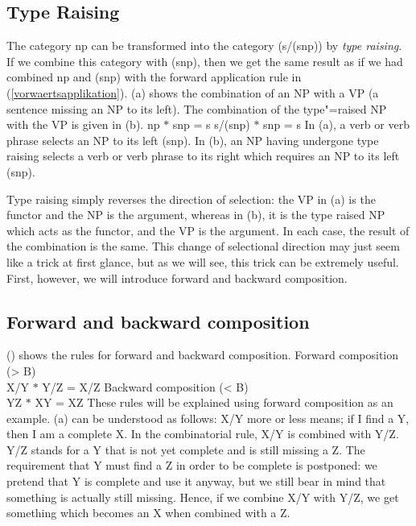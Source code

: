 \subsection{Type Raising}

\addlines
The category np can be transformed into the category (s/(s\bs np)) by \emph{type raising}. If we combine this category with (s\bs np), then we
get the same result as if we had combined np and (s\bs np) with the forward application rule in (\ref{vorwaertsapplikation}). (a) shows the combination of an NP
with a VP (a sentence missing an NP to its left). The combination of the type"=raised NP with the VP is given in (b).
\eal
\ex np $*$ s\bs np = s 
\ex s/(s\bs np) $*$ s\bs np = s
\zl
In (a), a verb or verb phrase selects an NP to its left (s\bs np). In (b), an NP having undergone type raising selects a verb or verb phrase to its right which requires
an NP to its left (s\bs np). 

Type raising simply reverses the direction of selection: the VP in (a) is the functor and the
NP is the argument, whereas in  (b), it is the type raised NP which acts as the functor,
and the VP is the argument. In each case, the result of the combination is the same. This change of selectional direction may just seem like a trick at first glance, but as we will see, this
trick can be extremely useful. First, however, we will introduce forward and backward composition.

\subsection{Forward and backward composition}
\label{Kategorialgrammatik-Komposition}

() shows the rules for forward and backward composition.
\eal
\ex\label{Regel-Vorwaertskomposition}
 Forward composition (> B)\\
    X/Y $*$ Y/Z = X/Z 
\ex Backward composition (< B)\\
    Y\bs Z $*$ X\bs Y = X\bs Z
\zl 
These rules will be explained using forward composition as an example. (a) can be understood as follows: X/Y more or less means; if I find a Y, then I am a complete X.
In the combinatorial rule, X/Y is combined with Y/Z. Y/Z stands for a Y that is not yet complete and is
still missing a Z. The requirement that Y must find a Z in order
to be complete is postponed: we pretend that Y is complete and use it anyway, but we still bear in mind that
something is actually still missing. Hence, if we combine X/Y with Y/Z, we get something which becomes an X when combined with a Z. 

